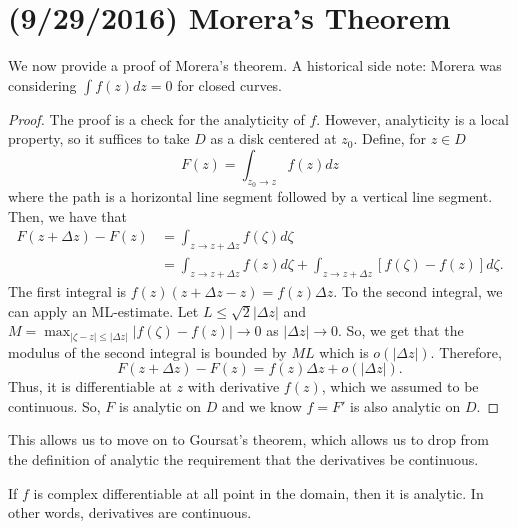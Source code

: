 \documentclass[11pt,leqno,oneside]{amsart}
\begin{document}
  \section{(9/29/2016) Morera's Theorem}
  We now provide a proof of Morera's theorem. A historical side note:
  Morera was considering $\int f(z)dz = 0$ for closed curves.
  \begin{proof}
    The proof is a check for the analyticity of $f$. However,
    analyticity is a local property, so it suffices to take $D$ as a
    disk centered at $z_0$. Define, for $z \in D$ \[
      F(z) = \int_{z_0 \to z} f(z)dz
    \]
    where the path is a horizontal line segment followed by a vertical
    line segment. Then, we have that
    \begin{align*}
      F(z+\Delta z) - F(z) & = \int_{z \to z+ \Delta z} f(\zeta)
                             d\zeta \\
      \ & = \int_{z \to z+\Delta z} f(z)d\zeta + \int_{z \to z +
          \Delta z} [f(\zeta) - f(z)]d\zeta.
    \end{align*}
    The first integral is $f(z)(z+\Delta z - z) = f(z) \Delta z$. To the
    second integral, we can apply an ML-estimate. Let $L \leq \sqrt{2}
    | \Delta z|$ and $M = \max_{|\zeta - z| \leq |\Delta z|} | f(\zeta) - f(z)| \to 0$ as $|\Delta
    z| \to 0$. So, we get
    that the modulus of the second integral is bounded by $ML$ which
    is $o(|\Delta z|)$. Therefore, \[
      F(z+\Delta z) - F(z) = f(z) \Delta z + o(|\Delta z|).
    \]
    Thus, it is differentiable at $z$ with derivative $f(z)$, which we
    assumed to be continuous. So, $F$ is analytic on $D$ and we know
    $f = F'$ is also analytic on $D$. 
  \end{proof}
  This allows us to move on to Goursat's theorem, which allows us to
  drop from the definition of analytic the requirement that the
  derivatives be continuous.
  \begin{thm}
    If $f$ is complex differentiable at all point in the domain, then
    it is analytic. In other words, derivatives are continuous.
  \end{thm}
\end{document}
